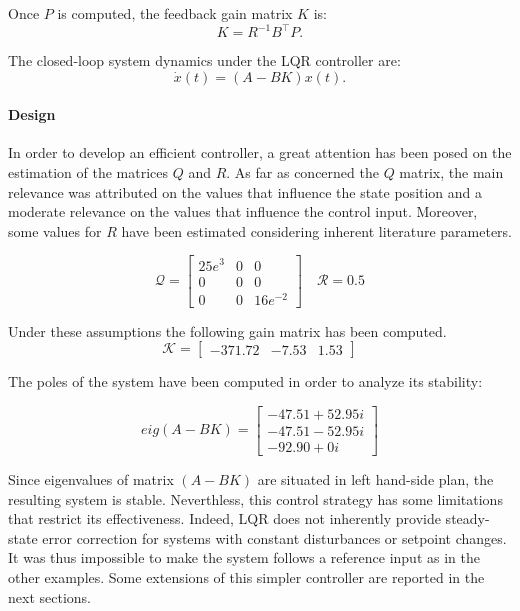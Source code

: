 Once $P$ is computed, the feedback gain matrix $K$ is:
\begin{equation}
    K = R^{-1} B^\top P.
\end{equation}

The closed-loop system dynamics under the LQR controller are:
\begin{equation}
    \dot{x}(t) = (A - B K)x(t).
\end{equation}

\paragraph{Design} In order to develop an efficient controller, a great attention has been posed on the estimation of the matrices $Q$ and $R$. As far as concerned the $Q$ matrix, the main relevance was attributed on the values that influence the state position and a moderate relevance on the values that influence the control input. Moreover, some values for $R$ have been estimated considering inherent literature parameters.

\begin{equation}
    \mathcal{Q} =
    \begin{bmatrix}
        25e^3 & 0 & 0 \\ 0 & 0 & 0\\ 0 & 0 & 16e^{-2}
    \end{bmatrix}
    \quad
    \mathcal{R} = 0.5
\end{equation}

Under these assumptions the following gain matrix has been computed.
\begin{equation}
    \mathcal{K} =
    \begin{bmatrix}
        -371.72 & -7.53 & 1.53
    \end{bmatrix}
\end{equation}

The poles of the system have been computed in order to analyze its stability:

\begin{equation}
    eig(A-BK) =
    \begin{bmatrix}
        -47.51 + 52.95i \\
        -47.51 - 52.95i \\
        -92.90 + 0i
    \end{bmatrix}
\end{equation}

Since eigenvalues of matrix $(A-BK)$ are situated in left hand-side plan, the resulting system is stable. Neverthless, this control strategy has some limitations that restrict its effectiveness. Indeed, LQR does not inherently provide steady-state error correction for systems with constant disturbances or setpoint changes. It was thus impossible to make the system follows a reference input as in the other examples. Some extensions of this simpler controller are reported in the next sections.

